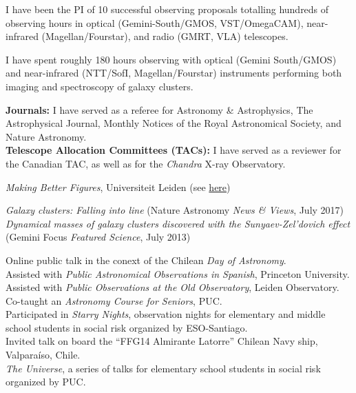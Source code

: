 \documentclass[11pt]{article}
\begin{document}
\noindent
I have been the PI of 10 successful observing proposals totalling hundreds of 
observing hours in optical (Gemini-South/GMOS, VST/OmegaCAM), near-infrared 
(Magellan/Fourstar), and radio (GMRT, VLA) telescopes.

{I have spent roughly 180 hours observing with 
optical (Gemini South/GMOS) and near-infrared (NTT/SofI, Magellan/Fourstar) instruments performing both 
imaging and spectroscopy of galaxy clusters.}


%


\noindent 
\textbf{Journals:} I have served as a referee for Astronomy \& Astrophysics, The Astrophysical Journal, Monthly Notices of the Royal 
    Astronomical Society, and Nature Astronomy.\\
\noindent
\textbf{Telescope Allocation Committees (TACs):} I have served as a reviewer for the Canadian TAC, as well as for the
    \textit{Chandra} X-ray Observatory.


\noindent
{} \emph{Making Better Figures}, Universiteit Leiden
(see \href{https://home.strw.leidenuniv.nl/~kenworthy/teaching/better_figures/}{here})


\noindent
\emph{Galaxy clusters: Falling into line} (Nature Astronomy \emph{News \& Views}, July 2017)\\
\emph{Dynamical masses of galaxy clusters discovered with the Sunyaev-Zel'dovich effect} (Gemini Focus \emph{Featured Science}, July 2013)


\noindent
{} Online public talk in the conext of the Chilean \textit{Day of Astronomy}.\\
 Assisted with \emph{Public Astronomical Observations in Spanish}, Princeton University.\\
 Assisted with \emph{Public Observations at the Old Observatory}, Leiden Observatory.\\
 Co-taught an \emph{Astronomy Course for Seniors}, PUC.\\
 Participated in \emph{Starry Nights}, observation nights for 
elementary and middle school students in social risk organized by ESO-Santiago.\\
 Invited talk on board the ``FFG14 Almirante Latorre'' Chilean Navy ship, Valpara\'iso, Chile.\\
 \emph{The Universe}, a series of talks for elementary school students in social risk organized by PUC.\\
\end{document}
